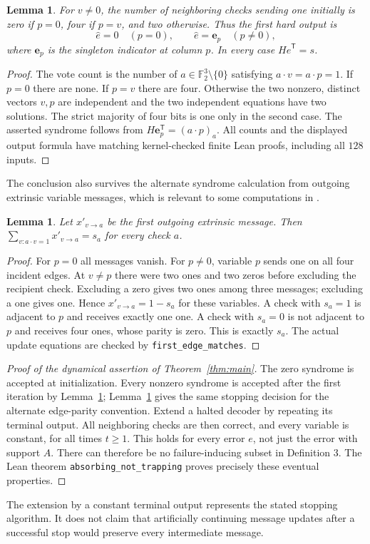 \documentclass[11pt]{article}
\newtheorem{lemma}[theorem]{Lemma}
\newcommand{\F}{\mathbb F_2}
\begin{document}
\begin{lemma}\label{lem:votes}
For $v\ne0$, the number of neighboring checks sending one initially is
zero if $p=0$, four if $p=v$, and two otherwise. Thus the first hard output is
\[
 \hat e=0\quad(p=0),\qquad \hat e=\mathbf e_p\quad(p\ne0),
\]
where $\mathbf e_p$ is the singleton indicator at column $p$.
In every case $H\hat e^{\mathsf T}=s$.
\end{lemma}
\begin{proof}
The vote count is the number of $a\in\F^3\setminus\{0\}$ satisfying
$a\cdot v=a\cdot p=1$. If $p=0$ there are none. If $p=v$ there are four.
Otherwise the two nonzero, distinct vectors $v,p$ are independent and the
two independent equations have two solutions. The strict majority of four
bits is one only in the second case. The asserted syndrome follows from
$H\mathbf e_p^{\mathsf T}=(a\cdot p)_a$.
All counts and the displayed output formula have matching kernel-checked
finite Lean proofs, including all $128$ inputs.
\end{proof}

The conclusion also survives the alternate syndrome calculation from outgoing
extrinsic variable messages, which is relevant to some computations in
\cite{mpk}.
\begin{lemma}\label{lem:edges}
Let $x'_{v\to a}$ be the first outgoing extrinsic message. Then
$\sum_{v:a\cdot v=1}x'_{v\to a}=s_a$ for every check $a$.
\end{lemma}
\begin{proof}
For $p=0$ all messages vanish. For $p\ne0$, variable $p$ sends one on all
four incident edges. At $v\ne p$ there were two ones and two zeros before
excluding the recipient check. Excluding a zero gives two ones among three
messages; excluding a one gives one. Hence $x'_{v\to a}=1-s_a$ for these
variables. A check with $s_a=1$ is adjacent to $p$ and receives exactly one
one. A check with $s_a=0$ is not adjacent to $p$ and receives four ones,
whose parity is zero. This is exactly $s_a$. The actual update equations
are checked by \texttt{first\_edge\_matches}.
\end{proof}

\begin{proof}[Proof of the dynamical assertion of Theorem~\ref{thm:main}]
The zero syndrome is accepted at initialization. Every nonzero syndrome
is accepted after the first iteration by Lemma~\ref{lem:votes};
Lemma~\ref{lem:edges} gives the same stopping decision for the alternate
edge-parity convention. Extend a halted decoder by repeating its terminal
output. All neighboring checks are then correct, and every variable is
constant, for all times $t\ge1$. This holds for every error $e$, not just
the error with support $A$. There can therefore be no failure-inducing
subset in Definition 3. The Lean theorem
\texttt{absorbing\_not\_trapping} proves precisely these eventual properties.
\end{proof}
The extension by a constant terminal output represents the stated stopping
algorithm. It does not claim that artificially continuing message updates
after a successful stop would preserve every intermediate message.
\end{document}
